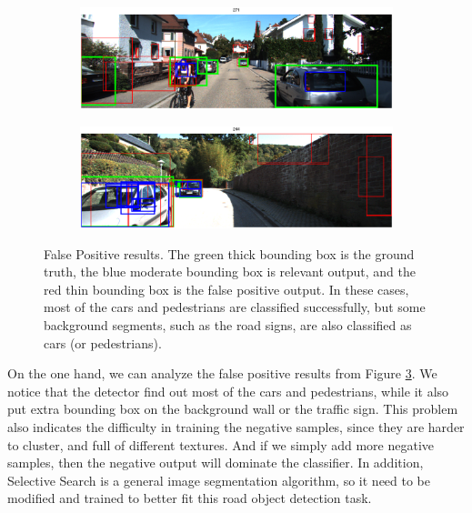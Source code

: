 \documentclass{article} %
\begin{document}
\begin{figure}[htb]
\begin{subfigure}[b]{0.5\textwidth}
    \includegraphics[width=.9\textwidth]{test-fp3.eps}
    \label{fig:test-fp3}
\end{subfigure}
\begin{subfigure}[b]{0.5\textwidth}
    \includegraphics[width=.9\textwidth]{test-fp4.eps}
    \label{fig:test-fp4}
\end{subfigure}
\caption{False Positive results. The green thick bounding box is the ground truth, the blue moderate bounding box is relevant output, and the red thin bounding box is the false positive output. In these cases, most of the cars and pedestrians are classified successfully, but some background segments, such as the road signs, are also classified as cars (or pedestrians).
\label{fig:test-fp}}
\end{figure}

On the one hand, we can analyze the false positive results from Figure \ref{fig:test-fp}. We notice that the detector find out most of the cars and pedestrians, while it also put extra bounding box on the background wall or the traffic sign. This problem also indicates the difficulty in training the negative samples, since they are harder to cluster, and full of different textures. And if we simply add more negative samples, then the negative output will dominate the classifier. In addition, Selective Search is a general image segmentation algorithm, so it need to be modified and trained to better fit this road object detection task. 
\end{document}
